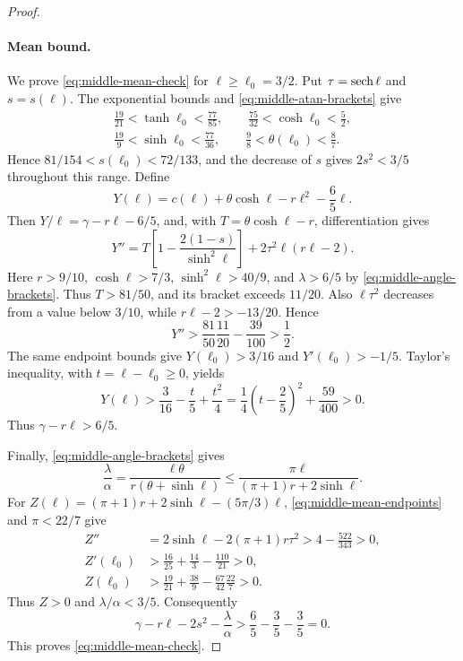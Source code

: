 \begin{proof}
\paragraph{Mean bound.}
We prove \eqref{eq:middle-mean-check} for \(\ell\ge\ell_0=3/2\).
Put \(\tau=\operatorname{sech}\ell\) and \(s=s(\ell)\). The exponential bounds
and \eqref{eq:middle-atan-brackets} give
\begin{equation}
 \begin{split}
 \frac{19}{21}<\tanh\ell_0<\frac{77}{85},\qquad
 \frac{75}{32}<\cosh\ell_0<\frac52,\\
 \frac{19}{9}<\sinh\ell_0<\frac{77}{36},\qquad
 \frac98<\theta(\ell_0)<\frac87.
 \end{split}
 \label{eq:middle-mean-endpoints}
\end{equation}
Hence \(81/154<s(\ell_0)<72/133\), and the decrease of \(s\)
gives \(2s^2<3/5\) throughout this range. Define
\[
 Y(\ell)=c(\ell)+\theta\cosh\ell-r\ell^2-\frac65\ell.
\]
Then \(Y/\ell=\gamma-r\ell-6/5\), and, with
\(T=\theta\cosh\ell-r\), differentiation gives
\[
 Y''=T\left[1-\frac{2(1-s)}{\sinh^2\ell}\right]
                       +2\tau^2\ell(r\ell-2).
\]
Here \(r>9/10\), \(\cosh\ell>7/3\),
\(\sinh^2\ell>40/9\), and \(\lambda>6/5\) by
\eqref{eq:middle-angle-brackets}. Thus \(T>81/50\), and its
bracket exceeds \(11/20\). Also \(\ell\tau^2\) decreases from a
value below \(3/10\), while \(r\ell-2>-13/20\). Hence
\[
 Y''>\frac{81}{50}\frac{11}{20}-\frac{39}{100}>\frac12.
\]
The same endpoint bounds give \(Y(\ell_0)>3/16\) and
\(Y'(\ell_0)>-1/5\). Taylor's inequality, with
\(t=\ell-\ell_0\ge0\), yields
\[
 Y(\ell)>\frac3{16}-\frac t5+\frac{t^2}{4}
 =\frac14\left(t-\frac25\right)^2+\frac{59}{400}>0.
\]
Thus \(\gamma-r\ell>6/5\).

Finally, \eqref{eq:middle-angle-brackets} gives
\[
 \frac\lambda\alpha
 =\frac{\ell\theta}{r(\theta+\sinh\ell)}
 \le\frac{\pi\ell}{(\pi+1)r+2\sinh\ell}.
\]
For \(Z(\ell)=(\pi+1)r+2\sinh\ell-(5\pi/3)\ell\),
\eqref{eq:middle-mean-endpoints} and \(\pi<22/7\) give
\begin{align*}
 Z''&=2\sinh\ell-2(\pi+1)r\tau^2>4-\frac{522}{343}>0,\\
 Z'(\ell_0)&>\frac{16}{25}+\frac{14}{3}-\frac{110}{21}>0,\\
 Z(\ell_0)&>\frac{19}{21}+\frac{38}{9}
                 -\frac{67}{42}\frac{22}{7}>0.
\end{align*}
Thus \(Z>0\) and \(\lambda/\alpha<3/5\). Consequently
\[
 \gamma-r\ell-2s^2-\frac\lambda\alpha
 >\frac65-\frac35-\frac35=0.
\]
This proves \eqref{eq:middle-mean-check}.
\end{proof}
